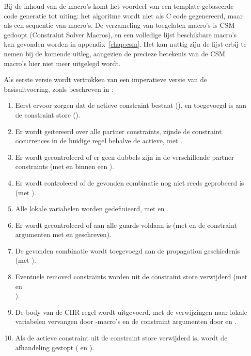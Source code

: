 Bij de inhoud van de macro's komt het voordeel van een template-gebaseerde code generatie tot uiting: het algoritme wordt niet als C code gegenereerd, maar als een sequentie van macro's. De verzameling van toegelaten macro's is CSM gedoopt (Constraint Solver Macros), en een volledige lijst beschikbare macro's kan gevonden worden in appendix~\ref{chap:csm}. Het kan nuttig zijn de lijst erbij te nemen bij de komende uitleg, aangezien de precieze betekenis van de CSM macro's hier niet meer uitgelegd wordt.

Als eerste versie wordt vertrokken van een imperatieve versie van de basisuitvoering, zoals beschreven in \cite{tomsphdthesis}:
\begin{enumerate}
  \item Eerst ervoor zorgen dat de actieve constraint bestaat (), en toegevoegd is aan de constraint store ().
  \item Er wordt ge\"itereerd over alle partner constraints, zijnde de constraint occurrences in de huidige regel behalve de actieve, met .
  \item Er wordt gecontroleerd of er geen dubbels zijn in de verschillende partner constraints (met  en  binnen een ).
  \item Er wordt controleerd of de gevonden combinatie nog niet reeds geprobeerd is (met ).
  \item Alle lokale variabelen worden gedefinieerd, met  en .
  \item Er wordt gecontroleerd of aan alle guards voldaan is (met  en de constraint argumenten met  en  geschreven).
  \item De gevonden combinatie wordt toegevoegd aan de propagation geschiedenis (met ).
  \item Eventuele removed constraints worden uit de constraint store verwijderd (met  en \\ ).
  \item De body van de CHR regel wordt uitgevoerd, met de verwijzingen naar lokale variabelen vervangen door -macro's en de constraint argumenten door  en .
  \item Als de actieve constraint uit de constraint store verwijderd is, wordt de afhandeling gestopt ( en ).
\end{enumerate}

